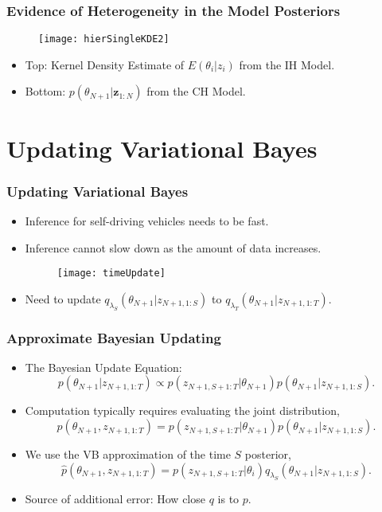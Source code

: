 \documentclass[11pt]{beamer}\usepackage[]{graphicx}\usepackage[]{color}
\begin{document}
\begin{frame}
\frametitle{Evidence of Heterogeneity in the Model Posteriors}
\begin{figure}
\centering
\texttt{[image: hierSingleKDE2]}
\end{figure}
\begin{itemize}
\item Top: Kernel Density Estimate of $E(\theta_i | z_i)$ from the IH Model.
\item Bottom: $p(\theta_{N+1} | \textbf{z}_{1:N})$ from the CH Model.
\end{itemize}
\end{frame}

\section{Updating Variational Bayes}

\begin{frame}
\frametitle{Updating Variational Bayes}
\begin{itemize}
\item Inference for self-driving vehicles needs to be fast.
\item Inference cannot slow down as the amount of data increases.
\begin{figure}[ht]
\centering
\texttt{[image: timeUpdate]}
\end{figure}
\item Need to update $q_{\lambda_S}(\theta_{N+1} | z_{N+1, 1:S})$ to $q_{\lambda_T}(\theta_{N+1} | z_{N+1, 1:T})$.
\end{itemize}
\end{frame}

\begin{frame}
\frametitle{Approximate Bayesian Updating}
\begin{itemize}
\item The Bayesian Update Equation: 
\begin{equation}
\label{updatePost}
p(\theta_{N+1} | z_{N+1, 1:T}) \propto p(z_{N+1, S+1:T} | \theta_{N+1})p(\theta_{N+1} | z_{N+1, 1:S}).
\end{equation}
\pause
\item Computation typically requires evaluating the joint distribution,
\begin{equation}
\label{updateJoint}
p(\theta_{N+1}, z_{N+1, 1:T}) = p(z_{N+1, S+1:T} | \theta_{N+1})p(\theta_{N+1} | z_{N+1, 1:S}).
\end{equation}
\pause
\item We use the VB approximation of the time $S$ posterior,
\begin{equation}
\label{ApproxJoint}
\hat{p}(\theta_{N+1},  z_{N+1, 1:T}) = p(z_{N+1, S+1:T} | \theta_{i})q_{\lambda_S}(\theta_{N+1} | z_{N+1, 1:S}).
\end{equation}
\item Source of additional error: How close $q$ is to $p$.
\end{itemize}
\end{frame}
\end{document}
